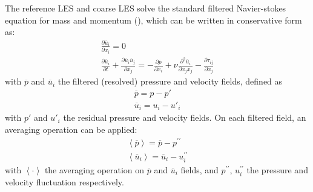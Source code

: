 The reference LES and coarse LES solve the standard filtered Navier-stokes equation for mass and momentum (\cite{Smagorinsky1963}), which can be written in conservative form as:
\begin{subequations}\label{subequ: fitlered Navier-Stokes}
	\begin{gather}
		\frac{\partial \overline{u}_i}{\partial x_i} = 0
		\label{equ - filtered mass}
		\\
		\frac{\partial \overline{u}_i}{\partial t}+ \frac{\partial \overline{u}_i \overline{u}_j}{\partial x_j}=-\frac{\partial \overline{p}}{\partial x_i}+\nu \frac{\partial^2 \overline{u}_i}{\partial x_{j}x_{j}}-\frac{\partial \tau_{ij}}{\partial x_j}
		\label{equ - filtered momentum}
	\end{gather}
\end{subequations}
with $\overline{p}$ and $\overline{u}_i$ the filtered (resolved) pressure and velocity fields, defined as
\begin{subequations}\label{subequ: filtering operation}
	\begin{gather}
		\overline{p}=p-p'
		\label{equ: p filterering}
		\\
		\overline{u}_i=u_i-u'_i
		\label{equ: u filterering}
	\end{gather}
\end{subequations}
with $p'$ and $u'_i$ the residual pressure and velocity fields. On each filtered field, an averaging operation can be applied:
\begin{subequations}\label{subequ: averaging operation}
	\begin{gather}
		\left\langle \overline{p} \right\rangle = \overline{p} - p^{\prime\prime}
		\label{equ: p averaging}
		\\
		\left\langle \overline{u}_i \right\rangle = \overline{u}_i - u_i^{\prime\prime}
		\label{equ: u averaging}
	\end{gather}
\end{subequations}
with $\left\langle \cdot \right\rangle$ the averaging operation on $\overline{p}$ and $\overline{u}_i$ fields,  and $p^{\prime\prime}$, $u_i^{\prime\prime}$ the pressure and velocity fluctuation respectively.

